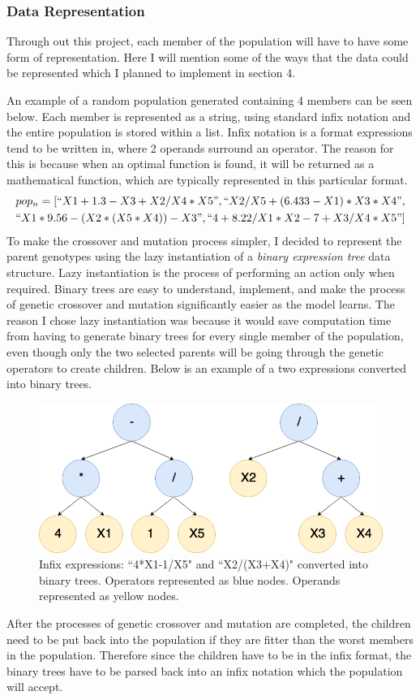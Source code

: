 \documentclass[11pt]{article}
\begin{document}
\subsubsection{Data Representation}
Through out this project, each member of the population will have to have some form of representation. Here I will mention some of the ways that the data could be represented which I planned to implement in section 4. 

An example of a random population generated containing 4 members can be seen below. Each member is represented as a string, using standard infix notation and the entire population is stored within a list. Infix notation is a format expressions tend to be written in, where 2 operands surround an operator. The reason for this is because when an optimal function is found, it will be returned as a mathematical function, which are typically represented in this particular format. 
\begin{align*}
pop_n = [``X1+1.3-X3+X2/X4*X5" ,``X2/X5+(6.433-X1)*X3*X4", \\
``X1*9.56-(X2*(X5*X4))-X3", ``4+8.22/X1*X2-7+X3/X4*X5"] 
\end{align*}
To make the crossover and mutation process simpler, I decided to represent the parent genotypes using the lazy instantiation of a \textit{binary expression tree} data structure. Lazy instantiation is the process of performing an action only when required. Binary trees are easy to understand, implement, and make the process of genetic crossover and mutation significantly easier as the model learns. The reason I chose lazy instantiation was because it would save computation time from having to generate binary trees for every single member of the population, even though only the two selected parents will be going through the genetic operators to create children. Below is an example of a two expressions converted into binary trees. 
\begin{figure}[h]
\centering
\includegraphics[scale = .30]{binaryT}
\caption{Infix expressions: ``4*X1-1/X5" and ``X2/(X3+X4)" converted into binary trees. Operators represented as blue nodes. Operands represented as yellow nodes. } 
\end{figure}
After the processes of genetic crossover and mutation are completed, the children need to be put back into the population if they are fitter than the worst members in the population. Therefore since the children have to be in the infix format, the binary trees have to be parsed back into an infix notation which the population will accept. 
\end{document}
